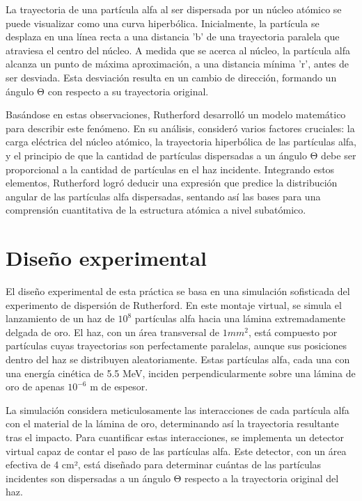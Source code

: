 \documentclass[twocolumn,a4paper,11pt]{scrartcl}
\begin{document}
La trayectoria de una partícula alfa al ser dispersada por un núcleo atómico se puede visualizar como una curva hiperbólica. Inicialmente, la partícula se desplaza en una línea recta a una distancia 'b' de una trayectoria paralela que atraviesa el centro del núcleo. A medida que se acerca al núcleo, la partícula alfa alcanza un punto de máxima aproximación, a una distancia mínima 'r', antes de ser desviada. Esta desviación resulta en un cambio de dirección, formando un ángulo Θ con respecto a su trayectoria original.

Basándose en estas observaciones, Rutherford desarrolló un modelo matemático para describir este fenómeno. En su análisis, consideró varios factores cruciales: la carga eléctrica del núcleo atómico, la trayectoria hiperbólica de las partículas alfa, y el principio de que la cantidad de partículas dispersadas a un ángulo Θ debe ser proporcional a la cantidad de partículas en el haz incidente. Integrando estos elementos, Rutherford logró deducir una expresión que predice la distribución angular de las partículas alfa dispersadas, sentando así las bases para una comprensión cuantitativa de la estructura atómica a nivel subatómico.

\section{Diseño experimental}
El diseño experimental de esta práctica se basa en una simulación sofisticada del experimento de dispersión de Rutherford. En este montaje virtual, se simula el lanzamiento de un haz de $10^8$ partículas alfa hacia una lámina extremadamente delgada de oro. El haz, con un área transversal de $1 mm^2$, está compuesto por partículas cuyas trayectorias son perfectamente paralelas, aunque sus posiciones dentro del haz se distribuyen aleatoriamente. Estas partículas alfa, cada una con una energía cinética de 5.5 MeV, inciden perpendicularmente sobre una lámina de oro de apenas $10^{-6}$ m de espesor.

La simulación considera meticulosamente las interacciones de cada partícula alfa con el material de la lámina de oro, determinando así la trayectoria resultante tras el impacto. Para cuantificar estas interacciones, se implementa un detector virtual capaz de contar el paso de las partículas alfa. Este detector, con un área efectiva de 4 cm², está diseñado para determinar cuántas de las partículas incidentes son dispersadas a un ángulo Θ respecto a la trayectoria original del haz.
\end{document}
